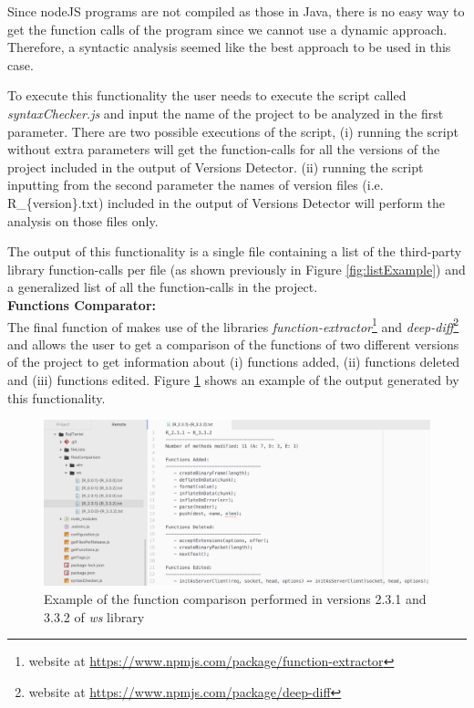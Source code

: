 Since nodeJS programs are not compiled as those in Java, there is no easy way to get the function calls of the program since we cannot use a dynamic approach. Therefore, a syntactic analysis seemed like the best approach to be used in this case.

To execute this functionality the user needs to execute the script called \textit{syntaxChecker.js} and input the name of the project to be analyzed in the first parameter. 
There are two possible executions of the script, 
(i) running the script without extra parameters will get the function-calls for all the versions of the project included in the output of Versions Detector. 
(ii) running the script inputting from the second parameter the names of version files (i.e. R\_\{version\}.txt) included in the output of Versions Detector will perform the analysis on those files only.

The output of this functionality is a single file containing a list of the third-party library function-calls per file (as shown previously in Figure \ref{fig:listExample}) and a generalized list of all the function-calls in the project.\\

\textbf{Functions Comparator:}\\
The final function of \tool[] makes use of the libraries \textit{function-extractor}\footnote{website at \url{https://www.npmjs.com/package/function-extractor}} and \textit{deep-diff}\footnote{website at \url{https://www.npmjs.com/package/deep-diff}} and allows the user to get a comparison of the functions of two different versions of the project to get information about (i) functions added, (ii) functions deleted and (iii) functions edited. Figure \ref{fig:compExample} shows an example of the output generated by this functionality.

\begin{figure}[ht!]
\centering
\includegraphics[width=1\textwidth]{images/comparison_example.png}
\caption{Example of the function comparison performed in versions 2.3.1 and 3.3.2 of \textit{ws} library}
\label{fig:compExample}
\end{figure}

